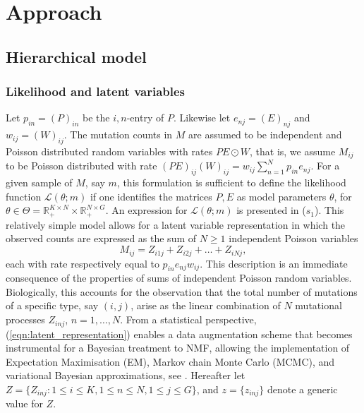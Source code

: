 \documentclass{bioinfo}
\begin{document}
\section{Approach}
\subsection{Hierarchical model}
\subsubsection{Likelihood and latent variables}
Let $p_{in} = (P)_{in}$ be the $i,n$-entry of $P$. Likewise let
$e_{nj} = (E)_{nj}$ and $w_{ij} = (W)_{ij}$.  The mutation counts in
$M$ are assumed to be independent and Poisson distributed random
variables with rates $PE\odot W$, that is, we assume $M_{ij}$ to be
Poisson distributed with rate $(PE)_{ij}(W)_{ij} = w_{ij}\sum_{n=1}^N
p_{in}e_{nj}$. For a given sample of $M$, say $m$, this formulation is
sufficient to define the likelihood function $\mathcal L(\theta; m)$
if one identifies the matrices $P, E$ as model parameters $\theta$,
for $\theta \in \Theta = \mathbb R_+^{K\times N}\times \mathbb
R_+^{N\times G}$. An expression for $\mathcal L(\theta; m)$ is
presented in ($s_1$). This relatively simple model allows for a latent
variable representation in which the observed counts are expressed as
the sum of $N\geqslant 1$ independent Poisson variables
\begin{equation}
  \label{eqn:latent_representation}
   M_{ij} = Z_{i1j} + Z_{i2j} + \ldots + Z_{iNj},
\end{equation} 
each with rate respectively equal to $p_{in}e_{nj}w_{ij}$. This
description is an immediate consequence of the properties of sums of
independent Poisson random variables. Biologically, this accounts for
the observation that the total number of mutations of a specific type,
say $(i,j)$, arise as the linear combination of $N$ mutational processes
$Z_{inj}$, $n = 1, \ldots, N$. From a statistical perspective,
(\ref{eqn:latent_representation}) enables a data augmentation scheme
that becomes instrumental for a Bayesian treatment to NMF, allowing
the implementation of Expectation Maximisation (EM), Markov chain
Monte Carlo (MCMC), and variational Bayesian approximations, see
\cite{C}.  Hereafter let $Z = \{Z_{inj}: 1\leqslant i\leqslant K,
1\leqslant n \leqslant N, 1\leqslant j\leqslant G\}$, and $z =
\{z_{inj}\}$ denote a generic value for $Z$.
\end{document}
